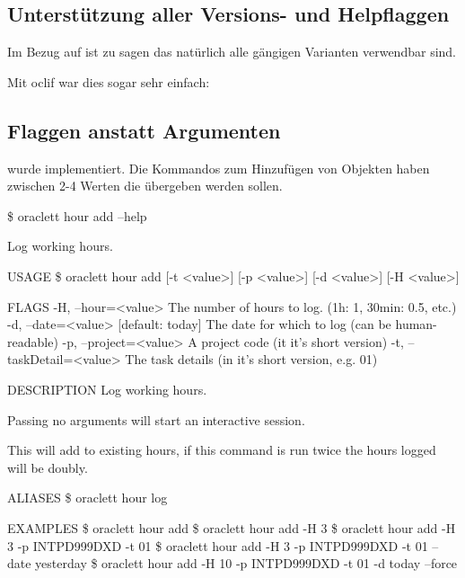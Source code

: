 \documentclass[oneside,bibliography=totocnumbered,BCOR=5mm]{scrbook}
\newenvironment{code}{\captionsetup{type=listing, skip=0pt}}{}
\begin{document}
\subsection{Unterstützung aller Versions- und Helpflaggen}

Im Bezug auf  ist zu sagen das natürlich alle
gängigen Varianten verwendbar sind.

Mit oclif war dies sogar sehr einfach:
\begin{code}
  \begin{javascriptcode}
...
"oclif": {
  "additionalHelpFlags": [
    "-h",
    "help"
  ],
  "additionalVersionFlags": [
    "-v",
    "-V",
    "version"
  ],
  ...
  \end{javascriptcode}
  \medskip
\end{code}

\subsection{Flaggen anstatt Argumenten}

 wurde implementiert. Die Kommandos zum Hinzufügen
von Objekten haben zwischen 2-4 Werten die übergeben werden sollen.

\begin{code}
  \begin{shellcode}
\$ oraclett hour add --help

Log working hours.

USAGE
  \$ oraclett hour add [-t <value>] [-p <value>] [-d <value>] [-H <value>]

FLAGS
  -H, --hour=<value>        The number of hours to log. (1h: 1, 30min: 0.5, etc.)
  -d, --date=<value>        [default: today] The date for which to log (can be human-readable)
  -p, --project=<value>     A project code (it it's short version)
  -t, --taskDetail=<value>  The task details (in it's short version, e.g. 01)

DESCRIPTION
  Log working hours.

  Passing no arguments will start an interactive session.

  This will add to existing hours, if this command is run twice the hours logged will be doubly.

ALIASES
  \$ oraclett hour log

EXAMPLES
  \$ oraclett hour add
  \$ oraclett hour add -H 3
  \$ oraclett hour add -H 3 -p INTPD999DXD -t 01
  \$ oraclett hour add -H 3 -p INTPD999DXD -t 01 --date yesterday
  \$ oraclett hour add -H 10 -p INTPD999DXD -t 01 -d today --force
  \end{shellcode}
  \medskip
\end{code}
\end{document}
